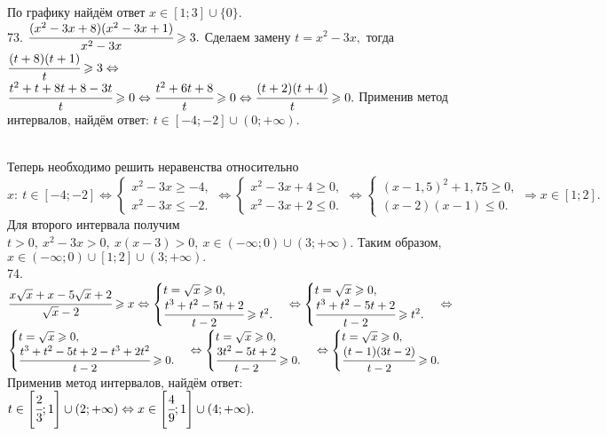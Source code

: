  По графику найдём ответ $x \in [1;3]\cup\{0\}.$\\
73. $\cfrac{(x^2-3x+8)(x^2-3x+1)}{x^2-3x}\geqslant3.$ Сделаем замену $t=x^2-3x,$ тогда $\cfrac{(t+8)(t+1)}{t}\geqslant3\Leftrightarrow$\\$
\cfrac{t^2+t+8t+8-3t}{t}\geqslant0\Leftrightarrow \cfrac{t^2+6t+8}{t}\geqslant0\Leftrightarrow \cfrac{(t+2)(t+4)}{t}\geqslant0.$ Применив метод интервалов, найдём ответ: $t\in[-4;-2]\cup(0;+\infty).$
\begin{figure}[ht!]
\end{figure}\\
Теперь необходимо решить неравенства относительно $x:\ t\in[-4;-2]\Leftrightarrow\begin{cases} x^2-3x\geqslant-4,\\ x^2-3x\leqslant-2.\end{cases}
\Leftrightarrow\begin{cases} x^2-3x+4\geqslant0,\\ x^2-3x+2\leqslant0.\end{cases}\Leftrightarrow
\begin{cases} (x-1,5)^2+1,75\geqslant0,\\ (x-2)(x-1)\leqslant0.\end{cases}\Rightarrow x\in[1;2].$ Для второго интервала получим $t>0,\ x^2-3x>0,\ x(x-3)>0,\
x\in(-\infty;0)\cup(3;+\infty).$ Таким образом,  $x\in(-\infty;0)\cup[1;2]\cup(3;+\infty).$\\
74. $\cfrac{x\sqrt{x}+x-5\sqrt{x}+2}{\sqrt{x}-2}\geqslant x \Leftrightarrow \begin{cases} t=\sqrt{x}\geqslant0,\\ \cfrac{t^3+t^2-5t+2}{t-2}\geqslant t^2.\end{cases}
\Leftrightarrow \begin{cases} t=\sqrt{x}\geqslant0,\\ \cfrac{t^3+t^2-5t+2}{t-2}\geqslant t^2.\end{cases}
\Leftrightarrow$\\$ \begin{cases} t=\sqrt{x}\geqslant0,\\ \cfrac{t^3+t^2-5t+2-t^3+2t^2}{t-2}\geqslant 0.\end{cases}
\Leftrightarrow \begin{cases} t=\sqrt{x}\geqslant0,\\ \cfrac{3t^2-5t+2}{t-2}\geqslant 0.\end{cases}
\Leftrightarrow \begin{cases} t=\sqrt{x}\geqslant0,\\ \cfrac{(t-1)(3t-2)}{t-2}\geqslant 0.\end{cases}$ Применив метод интервалов, найдём ответ: $t\in\left[\cfrac{2}{3};1\right]\cup(2;+\infty)\Leftrightarrow x \in\left[\cfrac{4}{9};1\right]\cup(4;+\infty).$
